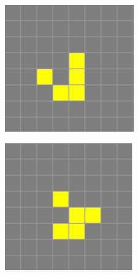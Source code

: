 \begin{figure}[b]
\begin{subfigure}{0.15\textwidth}
    \end{subfigure}
    \begin{subfigure}{0.15\textwidth}
        \includegraphics[width=\textwidth]{images/life-glider-3.png}
    \end{subfigure}
    \begin{subfigure}{0.15\textwidth}
        \includegraphics[width=\textwidth]{images/life-glider-4.png}

\end{subfigure}
\end{figure}
